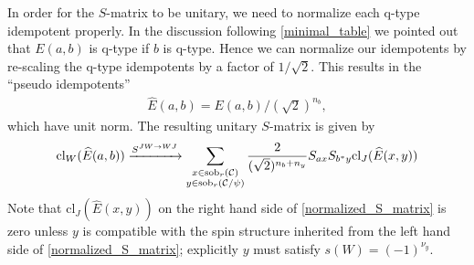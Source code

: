 In order for the $S$-matrix to be unitary, we need to normalize each q-type idempotent properly.
In the discussion following \eqref{minimal_table} we pointed out that $E(a,b)$ is q-type if $b$ is q-type.
Hence we can normalize our idempotents by re-scaling the q-type idempotents by a factor of $1/\sqrt{2}$. This results in the ``pseudo idempotents'' 
\begin{align} 
\widehat{E}(a,b) = E(a,b)/(\sqrt{2})^{n_b},
\end{align}
which have unit norm.
The resulting unitary $S$-matrix is given by
\begin{align}
\label{normalized_S_matrix}
\text{cl}_W(\widehat{E}(a,b)) \xrightarrow{S^{JW \rightarrow WJ}}  \sum_{\substack{x \in \text{sob}_r(\mathcal{C}) \\ y \in \text{sob}_r(\mathcal{C}/\psi) }} \frac{2}{(\sqrt{2})^{n_b+n_y}}S_{ax}  S_{b^*y}   \text{cl}_J(\widehat{E}(x,y))
\end{align}
Note that $\text{cl}_J(\widehat{E}(x,y))$ on the right hand side of \eqref{normalized_S_matrix} is zero unless $y$ is compatible with the spin structure inherited from the left hand side of \eqref{normalized_S_matrix};
explicitly $y$ must satisfy $s(W) = (-1)^{\nu_y}$.

